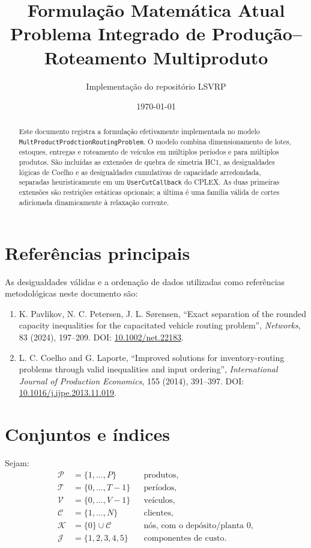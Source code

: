 \documentclass[11pt,a4paper]{article}
\title{Formulação Matemática Atual\\
       Problema Integrado de Produção--Roteamento Multiproduto}
\author{Implementação do repositório LSVRP}
\date{\today}
\newcommand{\set}[1]{\mathcal{#1}}
\begin{document}
\maketitle

\begin{abstract}
\sloppy
Este documento registra a formulação efetivamente implementada no modelo
\texttt{MultProduct\allowbreak{}Prodction\allowbreak{}Routing\allowbreak{}Problem}. O modelo combina dimensionamento
de lotes, estoques, entregas e roteamento de veículos em múltiplos períodos e
para múltiplos produtos. São incluídas as extensões de quebra de simetria HC1,
as desigualdades lógicas de Coelho e as desigualdades cumulativas de capacidade
arredondada, separadas heuristicamente em um \texttt{UserCutCallback} do CPLEX.
As duas primeiras extensões são restrições estáticas opcionais; a última é uma
família válida de cortes adicionada dinamicamente à relaxação corrente.
\end{abstract}

\section*{Referências principais}

As desigualdades válidas e a ordenação de dados utilizadas como referências
metodológicas neste documento são:

\begin{enumerate}
  \item K. Pavlikov, N. C. Petersen, J. L. Sørensen, ``Exact separation of
  the rounded capacity inequalities for the capacitated vehicle routing
  problem'', \emph{Networks}, 83 (2024), 197--209.
  DOI: \href{https://doi.org/10.1002/net.22183}{10.1002/net.22183}.

  \item L. C. Coelho and G. Laporte, ``Improved solutions for
  inventory-routing problems through valid inequalities and input ordering'',
  \emph{International Journal of Production Economics}, 155 (2014),
  391--397.
  DOI: \href{https://doi.org/10.1016/j.ijpe.2013.11.019}{10.1016/j.ijpe.2013.11.019}.
\end{enumerate}

\tableofcontents

\section{Conjuntos e índices}

Sejam:
\begin{align*}
  \set{P} &= \{1,\ldots,P\} &&\text{produtos},\\
  \set{T} &= \{0,\ldots,T-1\} &&\text{períodos},\\
  \set{V} &= \{0,\ldots,V-1\} &&\text{veículos},\\
  \set{C} &= \{1,\ldots,N\} &&\text{clientes},\\
  \set{K} &= \{0\}\cup\set{C} &&\text{nós, com o depósito/planta }0,\\
  \set{J} &= \{1,2,3,4,5\} &&\text{componentes de custo}.
\end{align*}
\end{document}
